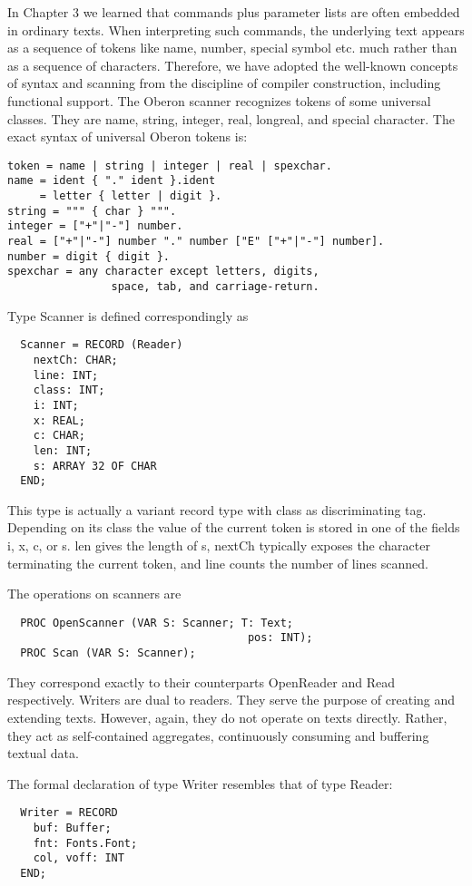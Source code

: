 In Chapter 3 we learned that commands plus parameter lists are often embedded in ordinary texts.
When interpreting such commands, the underlying text appears as a sequence of tokens like name,
number, special symbol etc. much rather than as a sequence of characters. Therefore, we have
adopted the well-known concepts of syntax and scanning from the discipline of compiler
construction, including functional support. The Oberon scanner recognizes tokens of some
universal classes. They are name, string, integer, real, longreal, and special character.
The exact syntax of universal Oberon tokens is:
\begin{verbatim}
token = name | string | integer | real | spexchar.
name = ident { "." ident }.ident
     = letter { letter | digit }.
string = """ { char } """.
integer = ["+"|"-"] number.
real = ["+"|"-"] number "." number ["E" ["+"|"-"] number].
number = digit { digit }.
spexchar = any character except letters, digits,
                space, tab, and carriage-return.
\end{verbatim}
Type Scanner is defined correspondingly as
\begin{verbatim}
  Scanner = RECORD (Reader)
    nextCh: CHAR;
    line: INT;
    class: INT;
    i: INT;
    x: REAL;
    c: CHAR;
    len: INT;
    s: ARRAY 32 OF CHAR
  END;
\end{verbatim}

This type is actually a variant record type with class as discriminating tag. Depending on its class
the value of the current token is stored in one of the fields i, x, c, or s. len gives the length of s,
nextCh typically exposes the character terminating the current token, and line counts the number of
lines scanned.

The operations on scanners are
\begin{verbatim}
  PROC OpenScanner (VAR S: Scanner; T: Text;
                                     pos: INT);
  PROC Scan (VAR S: Scanner);
\end{verbatim}

They correspond exactly to their counterparts OpenReader and Read respectively.
Writers are dual to readers. They serve the purpose of creating and extending texts. However,
again, they do not operate on texts directly. Rather, they act as self-contained aggregates,
continuously consuming and buffering textual data.

The formal declaration of type Writer resembles that of type Reader:
\begin{verbatim}
  Writer = RECORD
    buf: Buffer;
    fnt: Fonts.Font;
    col, voff: INT
  END;
\end{verbatim}

